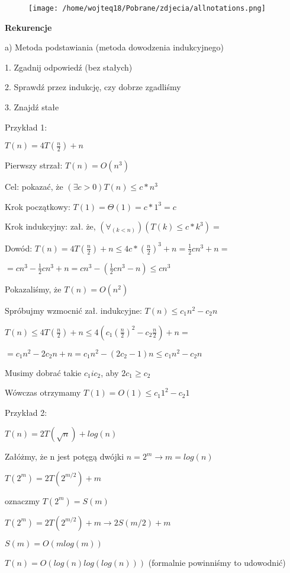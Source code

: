 \documentclass{article}
\begin{document}
\vspace{1\baselineskip}
\begin{figure}[H]
    \centering
    \texttt{[image: /home/wojteq18/Pobrane/zdjecia/allnotations.png]}
    \label{fig:example_image}
\end{figure}
\vspace{1\baselineskip}
\textbf{Rekurencje} \par
\vspace{1\baselineskip}
a) Metoda podstawiania (metoda dowodzenia indukcyjnego) \par
    \hspace{20pt}1. Zgadnij odpowiedź (bez stałych) \par
    \hspace{20pt}2. Sprawdź przez indukcję, czy dobrze zgadliśmy \par
    \hspace{20pt}3. Znajdź stałe \par
\vspace{1\baselineskip}
Przykład 1: \par
\vspace{1\baselineskip}
$T(n) = 4T(\frac{n}{2}) + n$   \par
Pierwszy strzał: $T(n) = O(n^3)$ \par
Cel: pokazać, że $(\exists c > 0) T(n) \leq c * n^3$ \par
Krok początkowy: $T(1) = \Theta (1) = c * 1^3 = c$ \par
Krok indukcyjny: zał. że, $(\forall_(k < n)) (T(k) \leq c * k^3) = $ \par
Dowód: $T(n) = 4T(\frac{n}{2}) + n \leq 4c * (\frac{n}{2})^3 + n = \frac{1}{2}cn^3 + n =$ \par
$= cn^3 - \frac{1}{2}cn^3 + n = cn^3 - (\frac{1}{2}cn^3 - n) \leq cn^3$ \par
Pokazaliśmy, że $T(n) = O(n^2)$ \par
\vspace{1\baselineskip}
Spróbujmy wzmocnić zał. indukcyjne: $T(n) \leq c_1 n^2 - c_2 n$ \par
$T(n) \leq 4T(\frac{n}{2}) + n \leq 4(c_1 (\frac{n}{2})^2 - c_2 \frac{n}{2}) + n = $ \par
$ = c_1 n^2 - 2c_2 n + n = c_1 n^2 - (2c_2 - 1)n \leq c_1 n^2 - c_2 n$ \par
Musimy dobrać takie $c_1 i c _2$, aby $2c_1 \geq c_2$ \par
Wówczas otrzymamy $T(1) = O(1) \leq c_1 1^2 - c_2 1$ \par
\vspace{9\baselineskip}
Przykład 2: \par
\vspace{1\baselineskip}
$T(n) = 2T(\sqrt{n}) + log(n)$ \par
Załóżmy, że n jest potęgą dwójki $n = 2^m \rightarrow m = log(n)$ \par
$T(2^m) = 2T(2^{m/2}) + m$ \par
oznaczmy $T(2^m) = S(m)$ \par
$T(2^m) = 2T(2^{m/2}) + m \rightarrow 2S(m/2) + m$ \par
$S(m) = O(m log(m))$ \par
$T(n) = O(log(n) log(log(n)))$ (formalnie powinniśmy to udowodnić) \par  
\end{document}
